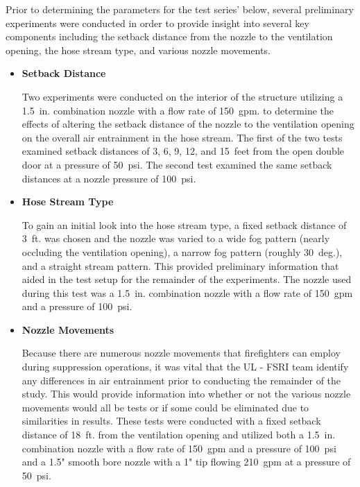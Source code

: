 \documentclass{article}
\begin{document}
Prior to determining the parameters for the test series' below, several preliminary experiments were conducted in order to provide insight into several key components including the setback distance from the nozzle to the ventilation opening, the hose stream type, and various nozzle movements.

\begin{itemize}

\item \bf{Setback Distance}
\normalfont
\vspace*{\baselineskip}

Two experiments were conducted on the interior of the structure utilizing a 1.5~in. combination nozzle with a flow rate of 150~gpm. to determine the effects of altering the setback distance of the nozzle to the ventilation opening on the overall air entrainment in the hose stream. The first of the two tests examined setback distances of 3, 6, 9, 12, and 15~feet from the open double door at a pressure of 50~psi. The second test examined the same setback distances at a nozzle pressure of 100~psi.  

\vspace*{\baselineskip}

\item \bf{Hose Stream Type}
\normalfont
\vspace*{\baselineskip}

To gain an initial look into the hose stream type, a fixed setback distance of 3~ft. was chosen and the nozzle was varied to a wide fog pattern (nearly occluding the ventilation opening), a narrow fog pattern (roughly 30~deg.), and a straight stream pattern. This provided preliminary information that aided in the test setup for the remainder of the experiments. The nozzle used during this test was a 1.5~in. combination nozzle with a flow rate of 150~gpm and a pressure of 100~psi.

\vspace*{\baselineskip}

\item \bf{Nozzle Movements}
\normalfont
\vspace*{\baselineskip}

Because there are numerous nozzle movements that firefighters can employ during suppression operations, it was vital that the UL - FSRI team identify any differences in air entrainment prior to conducting the remainder of the study. This would provide information into whether or not the various nozzle movements would all be tests or if some could be eliminated due to similarities in results. These tests were conducted with a fixed setback distance of 18~ft. from the ventilation opening and utilized both a 1.5~in. combination nozzle with a flow rate of 150~gpm and a pressure of 100~psi and a 1.5" smooth bore nozzle with a 1" tip flowing 210~gpm at a pressure of 50~psi.


\end{itemize}
\end{document}

